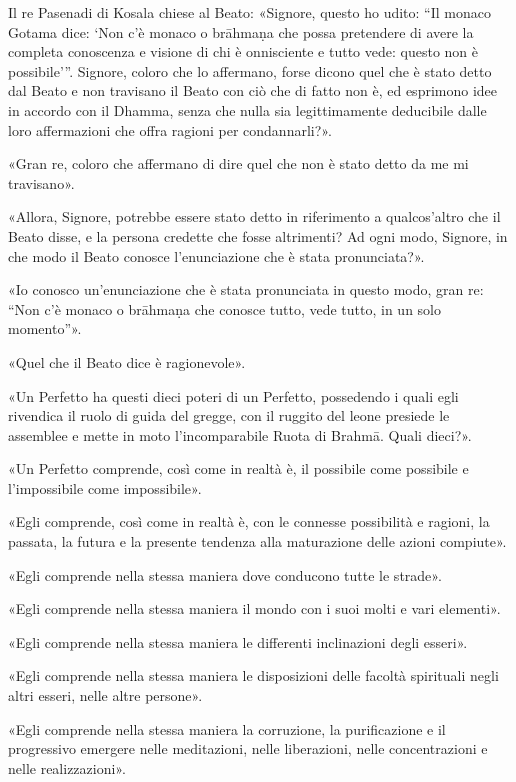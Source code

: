 
Il re Pasenadi di Kosala chiese al Beato: «Signore, questo ho udito: “Il monaco
Gotama dice: ‘Non c’è monaco o brāhmaṇa che possa pretendere di avere la
completa conoscenza e visione di chi è onnisciente e tutto vede: questo non è
possibile’”. Signore, coloro che lo affermano, forse dicono quel che è stato
detto dal Beato e non travisano il Beato con ciò che di fatto non è, ed
esprimono idee in accordo con il Dhamma, senza che nulla sia legittimamente
deducibile dalle loro affermazioni che offra ragioni per condannarli?».

«Gran re, coloro che affermano di dire quel che non è stato detto da me mi
travisano».

«Allora, Signore, potrebbe essere stato detto in riferimento a qualcos’altro che
il Beato disse, e la persona credette che fosse altrimenti? Ad ogni modo,
Signore, in che modo il Beato conosce l’enunciazione che è stata pronunciata?».

«Io conosco un’enunciazione che è stata pronunciata in questo modo, gran re:
“Non c’è monaco o brāhmaṇa che conosce tutto, vede tutto, in un solo momento”».

«Quel che il Beato dice è ragionevole».


\label{pag206}%
«Un Perfetto ha questi dieci poteri di un Perfetto, possedendo i quali egli
rivendica il ruolo di guida del gregge, con il ruggito del leone presiede le
assemblee e mette in moto l’incomparabile Ruota di Brahmā. Quali dieci?».

«Un Perfetto comprende, così come in realtà è, il possibile come possibile e
l’impossibile come impossibile».

«Egli comprende, così come in realtà è, con le connesse possibilità e ragioni,
la passata, la futura e la presente tendenza alla maturazione delle azioni
compiute».

«Egli comprende nella stessa maniera dove conducono tutte le strade».

«Egli comprende nella stessa maniera il mondo con i suoi molti e vari elementi».

«Egli comprende nella stessa maniera le differenti inclinazioni degli esseri».

«Egli comprende nella stessa maniera le disposizioni delle facoltà spirituali
negli altri esseri, nelle altre persone».

«Egli comprende nella stessa maniera la corruzione, la purificazione e il
progressivo emergere nelle meditazioni, nelle liberazioni, nelle concentrazioni
e nelle realizzazioni».

